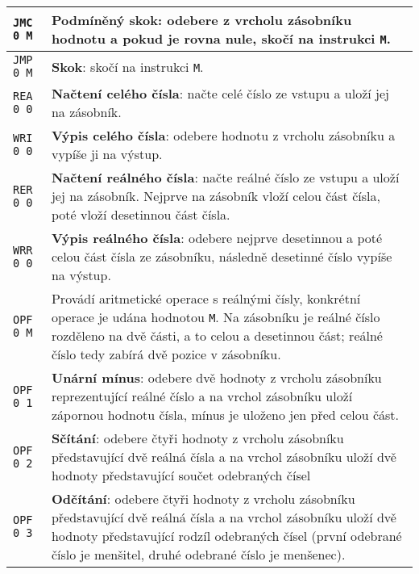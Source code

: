 \documentclass{article}
\begin{document}
\begin{longtable}{|l| p{10cm}|}
		\rule{0pt}{3ex} \texttt{JMC 0 M} & \textbf{Podmíněný skok}: odebere z vrcholu zásobníku hodnotu a pokud je rovna nule, skočí na instrukci \texttt{M}. \\ \hline
		
		\rule{0pt}{3ex} \texttt{JMP 0 M} & \textbf{Skok}: skočí na instrukci \texttt{M}. \\ \hline
		
		\rule{0pt}{3ex} \texttt{REA 0 0} & \textbf{Načtení celého čísla}: načte celé číslo ze vstupu a uloží jej na zásobník. \\ \hline
		
		\rule{0pt}{3ex} \texttt{WRI 0 0} & \textbf{Výpis celého čísla}: odebere hodnotu z vrcholu zásobníku a vypíše ji na výstup. \\ \hline
		
		\rule{0pt}{3ex} \texttt{RER 0 0} & \textbf{Načtení reálného čísla}: načte reálné číslo ze vstupu a uloží jej na zásobník. Nejprve na zásobník vloží celou část čísla, poté vloží desetinnou část čísla. \\ \hline
		
		\rule{0pt}{3ex} \texttt{WRR 0 0} & \textbf{Výpis reálného čísla}: odebere nejprve desetinnou a poté celou část čísla ze zásobníku, následně desetinné číslo vypíše na výstup.\\ \hline
		
		\rule{0pt}{3ex} \texttt{OPF 0 M} & Provádí aritmetické operace s reálnými čísly, konkrétní operace je udána hodnotou \texttt{M}. Na zásobníku je reálné číslo rozděleno na dvě části, a to celou a desetinnou část; reálné číslo tedy zabírá dvě pozice v zásobníku.\\
		
		\rule{0pt}{4ex} \texttt{OPF 0 1} & \textbf{Unární mínus}: odebere dvě hodnoty z vrcholu zásobníku reprezentující reálné číslo a na vrchol zásobníku uloží zápornou hodnotu čísla, mínus je uloženo jen před celou část. \\
		
		\rule{0pt}{4ex} \texttt{OPF 0 2} & \textbf{Sčítání}: odebere čtyři hodnoty z vrcholu zásobníku představující dvě reálná čísla a na vrchol zásobníku uloží dvě hodnoty představující součet odebraných čísel \\
		
		\rule{0pt}{4ex} \texttt{OPF 0 3} & \textbf{Odčítání}: odebere čtyři hodnoty z vrcholu zásobníku představující dvě reálná čísla a na vrchol zásobníku uloží dvě hodnoty představující rodzíl odebraných čísel (první odebrané číslo je menšitel, druhé odebrané číslo je menšenec). \\
		

\end{longtable}
\end{document}
